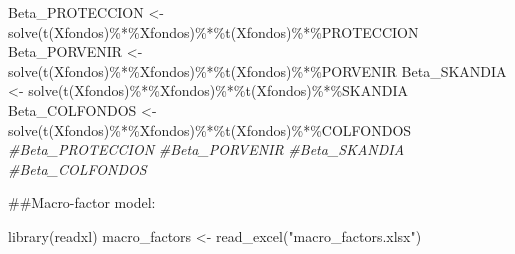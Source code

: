 \documentclass[
  12pt,
]{article}
\newenvironment{Shaded}{\begin{snugshade}}{\end{snugshade}}
\newcommand{\CommentTok}[1]{\textcolor[rgb]{0.56,0.35,0.01}{\textit{#1}}}
\newcommand{\FunctionTok}[1]{\textcolor[rgb]{0.00,0.00,0.00}{#1}}
\newcommand{\NormalTok}[1]{#1}
\newcommand{\OtherTok}[1]{\textcolor[rgb]{0.56,0.35,0.01}{#1}}
\newcommand{\SpecialCharTok}[1]{\textcolor[rgb]{0.00,0.00,0.00}{#1}}
\newcommand{\StringTok}[1]{\textcolor[rgb]{0.31,0.60,0.02}{#1}}
\begin{document}
\begin{Shaded}
\begin{Highlighting}[]
\NormalTok{Beta\_PROTECCION }\OtherTok{\textless{}{-}} \FunctionTok{solve}\NormalTok{(}\FunctionTok{t}\NormalTok{(Xfondos)}\SpecialCharTok{\%*\%}\NormalTok{Xfondos)}\SpecialCharTok{\%*\%}\FunctionTok{t}\NormalTok{(Xfondos)}\SpecialCharTok{\%*\%}\NormalTok{PROTECCION}
\NormalTok{Beta\_PORVENIR }\OtherTok{\textless{}{-}} \FunctionTok{solve}\NormalTok{(}\FunctionTok{t}\NormalTok{(Xfondos)}\SpecialCharTok{\%*\%}\NormalTok{Xfondos)}\SpecialCharTok{\%*\%}\FunctionTok{t}\NormalTok{(Xfondos)}\SpecialCharTok{\%*\%}\NormalTok{PORVENIR}
\NormalTok{Beta\_SKANDIA }\OtherTok{\textless{}{-}} \FunctionTok{solve}\NormalTok{(}\FunctionTok{t}\NormalTok{(Xfondos)}\SpecialCharTok{\%*\%}\NormalTok{Xfondos)}\SpecialCharTok{\%*\%}\FunctionTok{t}\NormalTok{(Xfondos)}\SpecialCharTok{\%*\%}\NormalTok{SKANDIA}
\NormalTok{Beta\_COLFONDOS }\OtherTok{\textless{}{-}} \FunctionTok{solve}\NormalTok{(}\FunctionTok{t}\NormalTok{(Xfondos)}\SpecialCharTok{\%*\%}\NormalTok{Xfondos)}\SpecialCharTok{\%*\%}\FunctionTok{t}\NormalTok{(Xfondos)}\SpecialCharTok{\%*\%}\NormalTok{COLFONDOS}
\CommentTok{\#Beta\_PROTECCION}
\CommentTok{\#Beta\_PORVENIR }
\CommentTok{\#Beta\_SKANDIA}
\CommentTok{\#Beta\_COLFONDOS}
\end{Highlighting}
\end{Shaded}

\#\#Macro-factor model:

\begin{Shaded}
\begin{Highlighting}[]
\FunctionTok{library}\NormalTok{(readxl)}
\NormalTok{macro\_factors }\OtherTok{\textless{}{-}} \FunctionTok{read\_excel}\NormalTok{(}\StringTok{"macro\_factors.xlsx"}\NormalTok{)}
\end{Highlighting}
\end{Shaded}

\begin{Shaded}
\end{Shaded}
\end{document}
